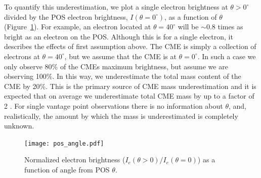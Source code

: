 To quantify this underestimation, we plot a single electron brightness at $\theta>0^{\circ}$ divided by the POS electron brightness, $I(\theta=0^{\circ})$, as a function of $\theta$ (Figure~\ref{fig:pos_angle}). For example, an electron located at $\theta=40^{\circ}$ will be $\sim$0.8 times as bright as an electron on the POS. Although this is for a single electron, it describes the effects of first assumption above. The CME is simply a collection of electrons at $\theta=40^{\circ}$, but we assume that the CME is at $\theta=0^{\circ}$. In such a case we only observe 80\% of the CMEs maximum brightness, but assume we are observing 100\%. In this way, we underestimate the total mass content of the CME by 20\%. This is the primary source of CME mass underestimation and it is expected that on average we underestimate total CME mass by up to a factor of 2 \citep{vou00}. For single vantage point observations there is no information about $\theta$, and, realistically, the amount by which the mass is underestimated is completely unknown.
\begin{figure}[!t]
\begin{center}
\texttt{[image: pos\_angle.pdf]}
\caption[Electron brightness as function of angle]{Normalized electron brightness ($I_e(\theta>0)/I_e(\theta=0)$) as a function of angle from POS $\theta$.}
\label{fig:pos_angle}
\end{center}
\end{figure}
%
%


